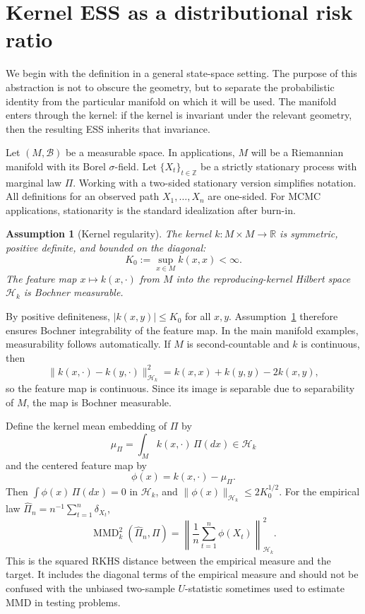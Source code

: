 \documentclass[11pt]{article}
\newtheorem{assumption}{Assumption}
\newcommand{\R}{\mathbb{R}}
\newcommand{\1}{\mathbf{1}}
\newcommand{\MMD}{\operatorname{MMD}}
\newcommand{\Hk}{\mathcal{H}_k}
\begin{document}
\section{Kernel ESS as a distributional risk ratio}
\label{sec:definition}

We begin with the definition in a general state-space setting. The purpose of this abstraction is not to obscure the geometry, but to separate the probabilistic identity from the particular manifold on which it will be used. The manifold enters through the kernel: if the kernel is invariant under the relevant geometry, then the resulting ESS inherits that invariance.

Let $(M,\mathscr B)$ be a measurable space. In applications, $M$ will be a Riemannian manifold with its Borel $\sigma$-field. Let $\{X_t\}_{t\in\mathbb Z}$ be a strictly stationary process with marginal law $\Pi$. Working with a two-sided stationary version simplifies notation. All definitions for an observed path $X_1,\ldots,X_n$ are one-sided. For MCMC applications, stationarity is the standard idealization after burn-in.

\begin{assumption}[Kernel regularity]
\label{ass:kernel}
The kernel $k:M\times M\to\R$ is symmetric, positive definite, and bounded on the diagonal:
\[
K_0:=\sup_{x\in M} k(x,x)<\infty.
\]
The feature map $x\mapsto k(x,\cdot)$ from $M$ into the reproducing-kernel Hilbert space $\Hk$ is Bochner measurable.
\end{assumption}

By positive definiteness, $|k(x,y)|\le K_0$ for all $x,y$. Assumption~\ref{ass:kernel} therefore ensures Bochner integrability of the feature map. In the main manifold examples, measurability follows automatically. If $M$ is second-countable and $k$ is continuous, then
\[
\|k(x,\cdot)-k(y,\cdot)\|_{\Hk}^2=k(x,x)+k(y,y)-2k(x,y),
\]
so the feature map is continuous. Since its image is separable due to separability of $M$, the map is Bochner measurable.

Define the kernel mean embedding of $\Pi$ by
\[
\mu_\Pi=\int_M k(x,\cdot)\,\Pi(dx)\in\Hk
\]
and the centered feature map by
\[
\phi(x)=k(x,\cdot)-\mu_\Pi.
\]
Then $\int\phi(x)\,\Pi(dx)=0$ in $\Hk$, and $\|\phi(x)\|_{\Hk}\le 2K_0^{1/2}$. For the empirical law $\hat\Pi_n=n^{-1}\sum_{t=1}^n\delta_{X_t}$,
\begin{equation}
\label{eq:mmd-centred}
\MMD_k^2(\hat\Pi_n,\Pi)
=
\left\|\frac1n\sum_{t=1}^n\phi(X_t)\right\|_{\Hk}^2.
\end{equation}
This is the squared RKHS distance between the empirical measure and the target. It includes the diagonal terms of the empirical measure and should not be confused with the unbiased two-sample $U$-statistic sometimes used to estimate MMD in testing problems.
\end{document}
